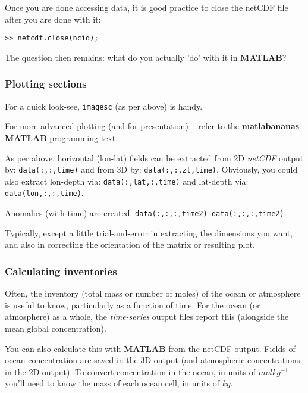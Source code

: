 \documentclass[11pt,fleqn]{book} %
\begin{document}
Once you are done accessing data, it is good practice to close the netCDF file after you are done with it:
\begin{verbatim}
>> netcdf.close(ncid);
\end{verbatim}

The question then remains: what do you actually 'do' with it in \textbf{MATLAB}?


\subsubsection{Plotting sections}

For a quick look-see, \texttt{imagesc} (as per above) is handy.

\noindent For more advanced plotting (and for presentation) -- refer to the \textbf{matlabananas} \textbf{MATLAB} programming text.

\noindent As per above, horizontal (lon-lat) fields can be extracted from 2D \textit{netCDF} output by: \texttt{data(:,:,time)} and from 3D by: \texttt{data(:,:,zt,time)}. Obviously, you could also extract lon-depth via: \texttt{data(:,lat,:,time)} and lat-depth via: \texttt{data(lon,:,:,time)}.

\noindent Anomalies (with time) are created: \texttt{data(:,:,:,time2)-data(:,:,:,time2)}.

Typically, except a little trial-and-error in extracting the dimensions you want, and also in correcting the orientation of the matrix or resulting plot.


\subsubsection{Calculating inventories}

Often, the inventory (total mass or number of moles) of the ocean or atmosphere is useful to know, particularly as a function of time. For the ocean (or atmosphere) as a whole, the \textit{time-series} output files report this (alongside the mean global concentration).

You can also calculate this with \textbf{MATLAB} from the netCDF output. Fields of ocean concentration are saved in the 3D output (and atmospheric concentrations in the 2D output). To convert concentration in the ocean, in units of \(molkg^{-1}\) you'll need to know the mass of each ocean cell, in units of \(kg\). 
\end{document}
